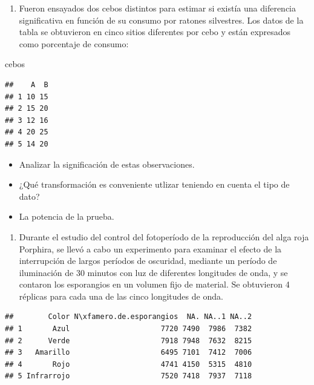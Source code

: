 \documentclass[]{book}
\newenvironment{Shaded}{\begin{snugshade}}{\end{snugshade}}
\newcommand{\NormalTok}[1]{#1}
\providecommand{\tightlist}{%
  \setlength{\itemsep}{0pt}\setlength{\parskip}{0pt}}
\theoremstyle{definition}
\theoremstyle{definition}
\theoremstyle{definition}
\theoremstyle{remark}
\begin{document}
\begin{enumerate}
\def\labelenumi{\arabic{enumi}.}
\setcounter{enumi}{1}
\tightlist
\item
  Fueron ensayados dos cebos distintos para estimar si existía una
  diferencia significativa en función de su consumo por ratones
  silvestres. Los datos de la tabla se obtuvieron en cinco sitios
  diferentes por cebo y están expresados como porcentaje de consumo:
\end{enumerate}

\begin{Shaded}
\begin{Highlighting}[]
\NormalTok{cebos}
\end{Highlighting}
\end{Shaded}

\begin{verbatim}
##    A  B
## 1 10 15
## 2 15 20
## 3 12 16
## 4 20 25
## 5 14 20
\end{verbatim}

\begin{itemize}
\tightlist
\item
  Analizar la significación de estas observaciones.
\item
  ¿Qué transformación es conveniente utlizar teniendo en cuenta el tipo
  de dato?
\item
  La potencia de la prueba.
\end{itemize}

\begin{enumerate}
\def\labelenumi{\arabic{enumi}.}
\setcounter{enumi}{2}
\tightlist
\item
  Durante el estudio del control del fotoperíodo de la reproducción del
  alga roja Porphira, se llevó a cabo un experimento para examinar el
  efecto de la interrupción de largos períodos de oscuridad, mediante un
  período de iluminación de 30 minutos con luz de diferentes longitudes
  de onda, y se contaron los esporangios en un volumen fijo de material.
  Se obtuvieron 4 réplicas para cada una de las cinco longitudes de
  onda.
\end{enumerate}

\begin{verbatim}
##        Color N\xfamero.de.esporangios  NA. NA..1 NA..2
## 1       Azul                     7720 7490  7986  7382
## 2      Verde                     7918 7948  7632  8215
## 3   Amarillo                     6495 7101  7412  7006
## 4       Rojo                     4741 4150  5315  4810
## 5 Infrarrojo                     7520 7418  7937  7118
\end{verbatim}
\end{document}
